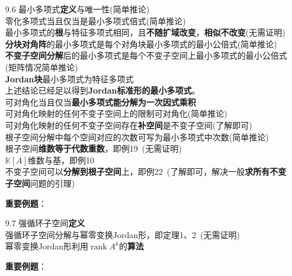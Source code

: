 \documentclass[a4paper,UTF8,fontset=windows,AutoFakeBold]{ctexart}
\DeclareMathOperator{\rank}{rank}
\newcommand*{\note}{\noindent *}
\begin{document}
\begin{enumerate}
    \item[9.6] 最小多项式\textbf{定义}与唯一性(简单推论)
    \\零化多项式当且仅当是最小多项式倍式(简单推论)
    \\最小多项式的\textbf{根}与特征多项式相同，且\textbf{不随扩域改变}，\textbf{相似不改变}(无需证明)
    \\\textbf{分块对角阵}的最小多项式是每个对角块最小多项式的最小公倍式(简单推论)
    \\\textbf{不变子空间分解}后的最小多项式是每个不变子空间上最小多项式的最小公倍式(矩阵情况简单推论)
    \\\textbf{Jordan块}最小多项式为特征多项式
    \\\note 上述结论已经足以得到\textbf{Jordan标准形的最小多项式}。
    \\可对角化当且仅当\textbf{最小多项式能分解为一次因式乘积}
    \\可对角化映射的任何不变子空间上的限制可对角化(简单推论)
    \\可对角化映射的任何不变子空间存在\textbf{补空间}是不变子空间(了解即可)
    \\根子空间分解中每个空间对应的次数可写为最小多项式中次数(简单推论)
    \\根子空间\textbf{维数等于代数重数}，即例19\ (无需证明)
    \\$\mathbb{K}[A]$维数与基，即例10
    \\不变子空间可以\textbf{分解到根子空间}上，即例22\ (了解即可，解决一般\textbf{求所有不变子空间}问题的引理)

    \textbf{重要例题}：

    \item[9.7] 强循环子空间\textbf{定义}
    \\强循环子空间分解与幂零变换Jordan形，即定理1、2\ (无需证明)
    \\幂零变换Jordan形利用$\rank A^k$的\textbf{算法}

    \textbf{重要例题}：


\end{enumerate}
\end{document}
